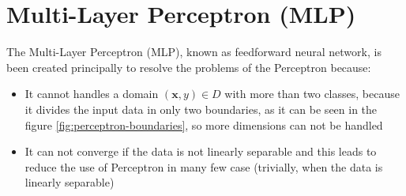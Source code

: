 \section{Multi-Layer Perceptron (MLP)}
The Multi-Layer Perceptron (MLP), known as feedforward neural network, is been created principally to resolve the problems of the Perceptron because:
\begin{itemize}
	\item{It cannot handles a domain $(\textbf{x}, y) \in D$ with more than two classes, because it divides the input data in only two boundaries, as it can be seen in the figure \ref{fig:perceptron-boundaries}, so more dimensions can not be handled}
	\item{It can not converge if the data is not linearly separable and this leads to reduce the use of Perceptron in many few case (trivially, when the data is linearly separable)}
\end{itemize}

